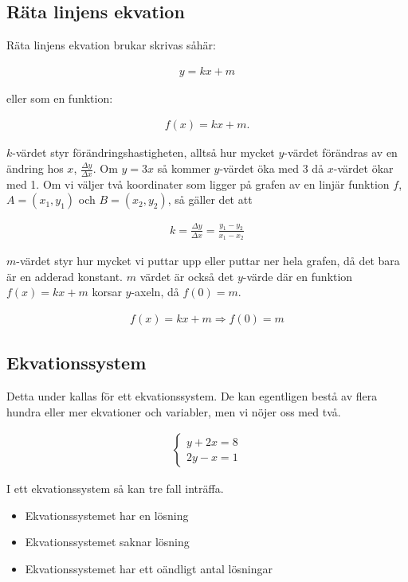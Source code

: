 \newpage
\subsection{Räta linjens ekvation}

Räta linjens ekvation brukar skrivas såhär:

\begin{align}
	y=kx+m
\end{align}

eller som en funktion:

\begin{align}
	f(x)=kx+m.
\end{align}

$k$-värdet styr förändringshastigheten, alltså hur mycket $y$-värdet förändras av en ändring hos $x$, $\frac{\Delta y}{\Delta x}$. Om $y = 3x$ så kommer $y$-värdet öka med $3$ då $x$-värdet ökar med 1. Om vi väljer två koordinater som ligger på grafen av en linjär funktion $f$, $A=(x_1,y_1)$ och $B=(x_2,y_2)$, så gäller det att

\begin{align}
	k = \frac{\Delta y}{\Delta x} = \frac{y_1-y_2}{x_1-x_2}
\end{align}

$m$-värdet styr hur mycket vi puttar upp eller puttar ner hela grafen, då det bara är en adderad konstant. $m$ värdet är också det $y$-värde där en funktion $f(x)=kx+m$ korsar $y$-axeln, då $f(0)=m$.

\begin{align}
	f(x) = kx+m \Rightarrow f(0) = m
\end{align}

\subsection{Ekvationssystem}

Detta under kallas för ett ekvationssystem. De kan egentligen bestå av flera hundra eller mer ekvationer och variabler, men vi nöjer oss med två.

\begin{align}
	\label{59}
	\begin{cases}
		y+2x=8 \\
		2y-x = 1
	\end{cases}
\end{align}

I ett ekvationssystem så kan tre fall inträffa. 

\begin{itemize}
	\item Ekvationssystemet har en lösning
	\item Ekvationssystemet saknar lösning
	\item Ekvationssystemet har ett oändligt antal lösningar
\end{itemize}

